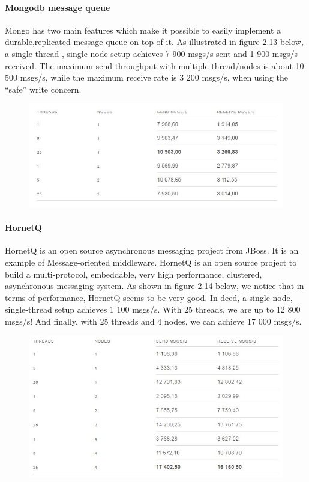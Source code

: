 \paragraph{Mongodb message queue}
\label{sec:sec01}
Mongo has two main features which make it possible to easily implement a durable,replicated message queue on top of it. As illustrated in figure 2.13 below, a single-thread
, single-node setup achieves 7 900 msgs/s sent and 1 900 msgs/s received. 
The maximum send throughput with multiple thread/nodes is about 10 500 msgs/s,
 while the maximum receive rate is 3 200 msgs/s, when using the “safe” write concern.
 \begin{figure}[h!]
	\centering
	\includegraphics[height=0.2\textheight]{fig01/MongodbMessageQ}
	\label{fig:FilialesEtClients}
\end{figure}


\paragraph{HornetQ}
\label{sec:sec01}
HornetQ is an open source asynchronous messaging project from JBoss. 
It is an example of Message-oriented middleware.
 HornetQ is an open source project to build a multi-protocol, embeddable, very high performance, clustered,
  asynchronous messaging system.
As shown in figure 2.14 below, we notice that in terms of performance, HornetQ seems to be very good. In deed, a single-node, single-thread setup achieves 1 100 msgs/s. With 25 threads, we are up to 12 800 msgs/s! And finally, with 25 threads and 4 nodes, we can achieve 17 000 msgs/s.
 \begin{figure}[h!]
	\centering
	\includegraphics[height=0.3\textheight]{fig01/HornetQ}
	\label{fig:FilialesEtClients}
\end{figure}
